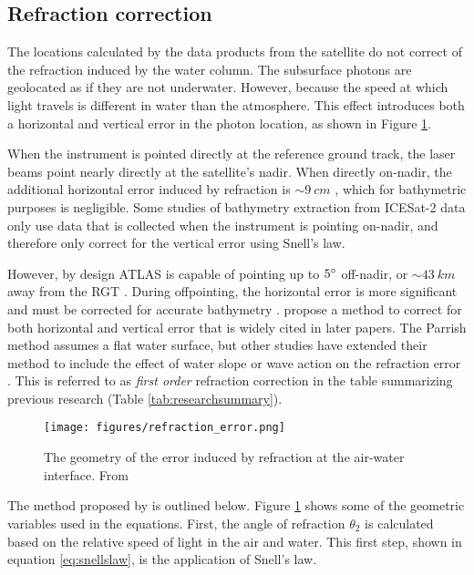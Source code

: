 \subsection{Refraction correction}

The locations calculated by the data products from the satellite do not correct of the refraction induced by the water column. The subsurface photons are geolocated as if they are not underwater. However, because the speed at which light travels is different in water than the atmosphere. This effect introduces both a horizontal and vertical error in the photon location, as shown in Figure \ref{refract-image}.

When the instrument is pointed directly at the reference ground track, the laser beams point nearly directly at the satellite's nadir. When directly on-nadir, the additional horizontal error induced by refraction is $\sim 9~cm$ \parencite{Parrish2019}, which for bathymetric purposes is negligible. Some studies of bathymetry extraction from ICESat-2 data only use data that is collected when the instrument is pointing on-nadir, and therefore only correct for the vertical error using Snell's law.

However, by design ATLAS is capable of pointing up to $5 \degree$ off-nadir, or $\sim43~km$ away from the RGT \parencite{Magruder2021}. During offpointing, the horizontal error is more significant and must be corrected for accurate bathymetry \parencite{Parrish2019}. \citeauthor{Parrish2019} propose a method to correct for both horizontal and vertical error that is widely cited in later papers. The Parrish method assumes a flat water surface, but other studies have extended their method to include the effect of water slope or wave action on the refraction error \parencite{Ma2020,Zhang2022}.  This is referred to as \emph{first order} refraction correction in the table summarizing previous research (Table \ref{tab:researchsummary}).


\begin{figure}[!ht]
      \centering
      \texttt{[image: figures/refraction\_error.png]}
      \caption{The geometry of the error induced by refraction at the air-water interface. From \cite{Parrish2019}}
      \label{refract-image}
\end{figure}

The method proposed by \citeauthor{Parrish2019} is outlined below. Figure \ref{refract-image} shows some of the geometric variables used in the equations. First, the angle of refraction $\theta_2$ is calculated based on the relative speed of light in the air and water. This first step, shown in equation \ref{eq:snellslaw}, is the application of Snell's law.

